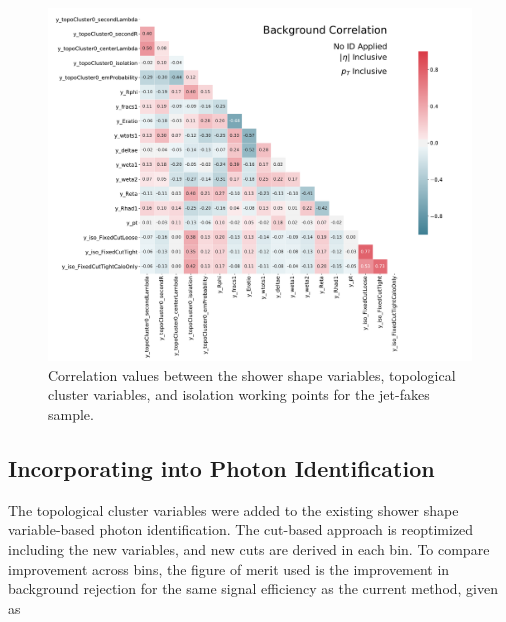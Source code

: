 \begin{figure}[!hp]
    \centering
    \includegraphics[width=\textwidth]{chapters/chapter4_photonID/images/bkg_none_corr.pdf}
    \caption[Correlation values between the shower shape variables, topological cluster variables, and isolation working points for the jet-fakes sample] {Correlation values between the shower shape variables, topological cluster variables, and isolation working points for the jet-fakes sample.}
    \label{fig:photonid-corrs-bkg}
\end{figure}

\subsection{Incorporating into Photon Identification}

The topological cluster variables were added to the existing shower shape variable-based photon identification. The cut-based approach is reoptimized including the new variables, and new cuts are derived in each \etaPt bin. To compare improvement across bins, the figure of merit used is the improvement in background rejection for the same signal efficiency as the current method, given as

